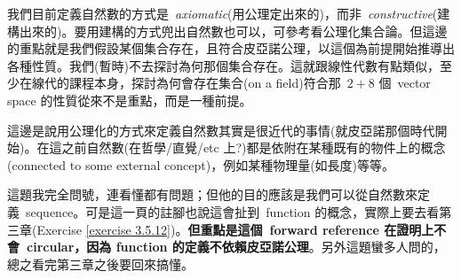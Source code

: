 \begin{remark}\label{remark 2.1.14}
我們目前定義自然數的方式是\ \emph{axiomatic}(用公理定出來的)，而非\ \emph{constructive}(建構出來的)。要用建構的方式兜出自然數也可以，可參考看公理化集合論。但這邊的重點就是我們假設某個集合存在，且符合皮亞諾公理，以這個為前提開始推導出各種性質。我們(暫時)不去探討為何那個集合存在。這就跟線性代數有點類似，至少在線代的課程本身，探討為何會存在集合(on a field)符合那\ \(2+8\) 個\ vector space 的性質從來不是重點，而是一種前提。
\end{remark}

\begin{remark}\label{remark 2.1.15}
這邊是說用公理化的方式來定義自然數其實是很近代的事情(就皮亞諾那個時代開始)。在這之前自然數(在哲學/直覺/etc 上?)都是依附在某種既有的物件上的概念(connected to some external concept)，例如某種物理量(如長度)等等。
\end{remark}

\begin{proposition}  \label{prop 2.1.16}
 這題我完全問號，連看懂都有問題；但他的目的應該是我們可以從自然數來定義\ sequence。可是這一頁的註腳也說這會扯到\ function 的概念，實際上要去看第三章(Exercise \ref{exercise 3.5.12})。\textbf{但重點是這個\ forward reference 在證明上不會\ circular，因為 function 的定義不依賴皮亞諾公理}。另外這題蠻多人問的，總之看完第三章之後要回來搞懂。
\end{proposition}